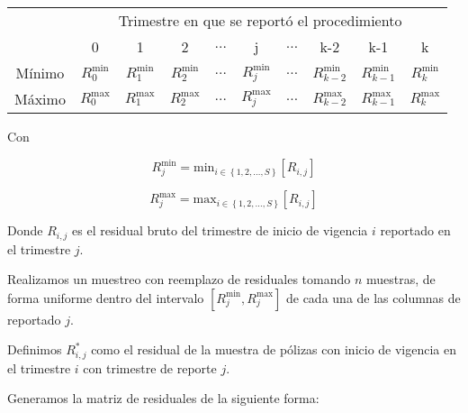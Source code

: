\documentclass[11pt,twoside,openright,spanish]{report}
\numberwithin{equation}{chapter}
\numberwithin{figure}{chapter}
\numberwithin{table}{chapter}
\begin{document}
	\begin{table}[ht]
		\centering
		\begin{tabularx}{\linewidth}{ c|ccccccccc}
			& \multicolumn{9}{c}{Trimestre en que se reportó el procedimiento} \\
			& 0  & 1 & 2 & $ \dots $ & j & $\dots $ & k-2 & k-1 &  k\\
			\midrule
			Mínimo      &  $R_{0}^{\text{min}}$ & $R_{1}^{\text{min}}$ & $R_{2}^{\text{min}}$ & $ \dots $ & $R_{j}^{\text{min}}$ & $ \dots $ & $R_{k-2}^{\text{min}}$ & $R_{k-1}^{\text{min}}$ & $R_{k}^{\text{min}}$ \\
			Máximo      &  $R_{0}^{\text{max}}$ & $R_{1}^{\text{max}}$ & $R_{2}^{\text{max}}$ & $ \dots $ & $R_{j}^{\text{max}}$ & $ \dots $ & $R_{k-2}^{\text{max}}$ & $R_{k-1}^{\text{max}}$ & $R_{k}^{\text{max}}$ \\
		\end{tabularx}
	\end{table}
	
	Con

	$$R_{j}^{\text{min}}= \text{min}_{ i\in \left\{1,2,\dots ,S\right\}} \left[R_{i,j}^{}\right]$$	
	
	$$R_{j}^{\text{max}}= \text{max}_{ i\in \left\{1,2,\dots ,S\right\}} \left[R_{i,j}^{}\right]$$	 

	Donde $R_{i,j}$ es el residual bruto del trimestre de inicio de vigencia $i$ reportado en el trimestre $j$.

	Realizamos un muestreo con reemplazo de residuales tomando $n$ muestras, de forma uniforme dentro del intervalo $\left[R_{j}^{\text{min}},R_{j}^{\text{max}}\right]$ de cada una de las columnas de reportado $j$.
	
	Definimos $R_{i,j}^{*}$ como el residual de la muestra de pólizas con inicio de vigencia en el trimestre $i$ con trimestre de reporte $j$. 
	
	Generamos la matriz de residuales de la siguiente forma:
	
\end{document}
